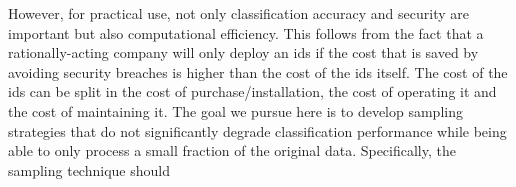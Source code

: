 \documentclass[conference]{IEEEtran}
\begin{document}

However, for practical use, not only classification accuracy and security are important but also computational efficiency. This follows from the fact that a rationally-acting company will only deploy an \gls{ids} if the cost that is saved by avoiding security breaches is higher than the cost of the \gls{ids} itself. The cost of the \gls{ids} can be split in the cost of purchase/installation, the cost of operating it and the cost of maintaining it. The goal we pursue here is to develop sampling strategies that do not significantly degrade classification performance while being able to only process a small fraction of the original data. Specifically, the sampling technique should

\end{document}
